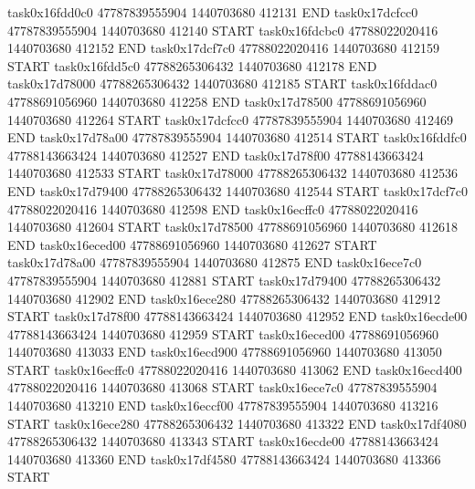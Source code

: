 task0x16fdd0c0 47787839555904          1440703680               412131  END
task0x17dcfcc0 47787839555904          1440703680               412140  START
task0x16fdcbc0 47788022020416          1440703680               412152  END
task0x17dcf7c0 47788022020416          1440703680               412159  START
task0x16fdd5c0 47788265306432          1440703680               412178  END
task0x17d78000 47788265306432          1440703680               412185  START
task0x16fddac0 47788691056960          1440703680               412258  END
task0x17d78500 47788691056960          1440703680               412264  START
task0x17dcfcc0 47787839555904          1440703680               412469  END
task0x17d78a00 47787839555904          1440703680               412514  START
task0x16fddfc0 47788143663424          1440703680               412527  END
task0x17d78f00 47788143663424          1440703680               412533  START
task0x17d78000 47788265306432          1440703680               412536  END
task0x17d79400 47788265306432          1440703680               412544  START
task0x17dcf7c0 47788022020416          1440703680               412598  END
task0x16ecffc0 47788022020416          1440703680               412604  START
task0x17d78500 47788691056960          1440703680               412618  END
task0x16eced00 47788691056960          1440703680               412627  START
task0x17d78a00 47787839555904          1440703680               412875  END
task0x16ece7c0 47787839555904          1440703680               412881  START
task0x17d79400 47788265306432          1440703680               412902  END
task0x16ece280 47788265306432          1440703680               412912  START
task0x17d78f00 47788143663424          1440703680               412952  END
task0x16ecde00 47788143663424          1440703680               412959  START
task0x16eced00 47788691056960          1440703680               413033  END
task0x16ecd900 47788691056960          1440703680               413050  START
task0x16ecffc0 47788022020416          1440703680               413062  END
task0x16ecd400 47788022020416          1440703680               413068  START
task0x16ece7c0 47787839555904          1440703680               413210  END
task0x16eccf00 47787839555904          1440703680               413216  START
task0x16ece280 47788265306432          1440703680               413322  END
task0x17df4080 47788265306432          1440703680               413343  START
task0x16ecde00 47788143663424          1440703680               413360  END
task0x17df4580 47788143663424          1440703680               413366  START
